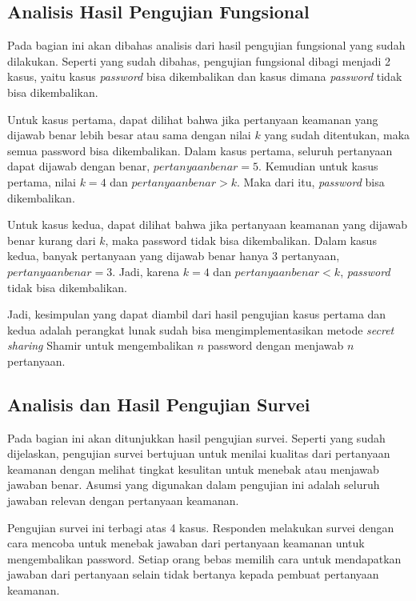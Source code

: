 \subsection{Analisis Hasil Pengujian Fungsional}

Pada bagian ini akan dibahas analisis dari hasil pengujian fungsional yang sudah dilakukan. Seperti yang sudah dibahas, pengujian fungsional dibagi menjadi 2 kasus, yaitu kasus \textit{password} bisa dikembalikan dan kasus dimana \textit{password} tidak bisa dikembalikan.

Untuk kasus pertama, dapat dilihat bahwa jika pertanyaan keamanan yang dijawab benar lebih besar atau sama dengan nilai $k$ yang sudah ditentukan, maka semua password bisa dikembalikan. Dalam kasus pertama, seluruh pertanyaan dapat dijawab dengan benar, $pertanyaan benar = 5$. Kemudian untuk kasus pertama, nilai $k=4$ dan $pertanyaan benar > k$. Maka dari itu, \textit{password} bisa dikembalikan.

Untuk kasus kedua, dapat dilihat bahwa jika pertanyaan keamanan yang dijawab benar kurang dari $k$, maka password tidak bisa dikembalikan. Dalam kasus kedua, banyak pertanyaan yang dijawab benar hanya 3 pertanyaan, $pertanyaan benar=3$. Jadi, karena $k=4$ dan $pertanyaan benar < k$, \textit{password} tidak bisa dikembalikan.

Jadi, kesimpulan yang dapat diambil dari hasil pengujian kasus pertama dan kedua adalah perangkat lunak sudah bisa mengimplementasikan metode \textit{secret sharing} Shamir untuk mengembalikan $n$ password dengan menjawab $n$ pertanyaan.

\subsection{Analisis dan Hasil Pengujian Survei}\label{subsec:hasil_pengujian_survei}

Pada bagian ini akan ditunjukkan hasil pengujian survei. Seperti yang sudah dijelaskan, pengujian survei bertujuan untuk menilai kualitas dari pertanyaan keamanan dengan melihat tingkat kesulitan untuk menebak atau menjawab jawaban benar. Asumsi yang digunakan dalam pengujian ini adalah seluruh jawaban relevan dengan pertanyaan keamanan.

Pengujian survei ini terbagi atas 4 kasus. Responden melakukan survei dengan cara mencoba untuk menebak jawaban dari pertanyaan keamanan untuk mengembalikan password. Setiap orang bebas memilih cara untuk mendapatkan jawaban dari pertanyaan selain tidak bertanya kepada pembuat pertanyaan keamanan.

